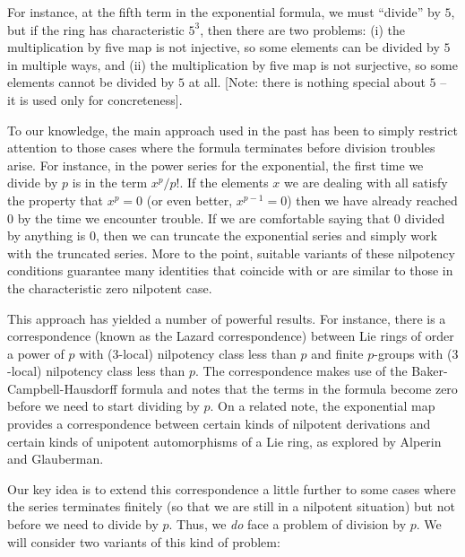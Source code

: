 \documentclass[10pt]{amsart}
\begin{document}
For instance, at the fifth term in the exponential formula, we must
``divide'' by $5$, but if the ring has characteristic $5^3$, then
there are two problems: (i) the multiplication by five map is not
injective, so some elements can be divided by $5$ in multiple ways,
and (ii) the multiplication by five map is not surjective, so some
elements cannot be divided by $5$ at all. [Note: there is nothing
special about $5$ -- it is used only for concreteness].

To our knowledge, the main approach used in the past has been to
simply restrict attention to those cases where the formula terminates
before division troubles arise. For instance, in the power series for
the exponential, the first time we divide by $p$ is in the term
$x^p/p!$. If the elements $x$ we are dealing with all satisfy the
property that $x^p = 0$ (or even better, $x^{p-1} = 0$) then we have
already reached $0$ by the time we encounter trouble. If we are
comfortable saying that $0$ divided by anything is $0$, then we can
truncate the exponential series and simply work with the truncated
series. More to the point, suitable variants of these nilpotency
conditions guarantee many identities that coincide with or are similar
to those in the characteristic zero nilpotent case.

This approach has yielded a number of powerful results. For instance,
there is a correspondence (known as the Lazard correspondence) between
Lie rings of order a power of $p$ with ($3$-local) nilpotency class
less than $p$ and finite $p$-groups with ($3$-local) nilpotency class
less than $p$. The correspondence makes use of the
Baker-Campbell-Hausdorff formula and notes that the terms in the
formula become zero before we need to start dividing by $p$. On a
related note, the exponential map provides a correspondence between
certain kinds of nilpotent derivations and certain kinds of unipotent
automorphisms of a Lie ring, as explored by Alperin and Glauberman.

Our key idea is to extend this correspondence a little further to some
cases where the series terminates finitely (so that we are still in a
nilpotent situation) but not before we need to divide by $p$. Thus, we
{\em do} face a problem of division by $p$. We will consider two
variants of this kind of problem:
\end{document}
